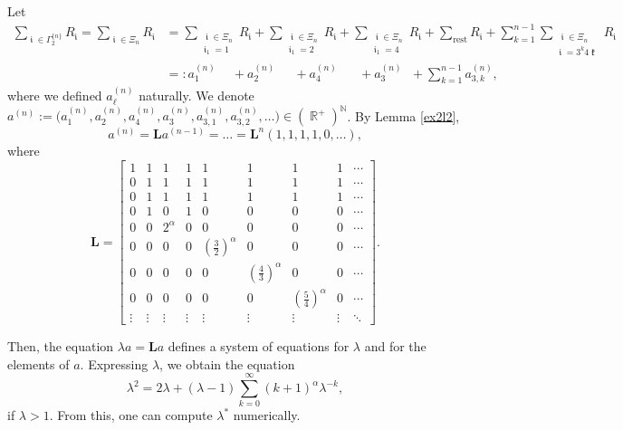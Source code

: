 \documentclass[a4paper, 11pt]{article}
\DeclareMathOperator{\N}{\mathbb{N}}
\DeclareMathOperator{\R}{\mathbb{R}}
\DeclareMathOperator{\iii}{\mathfrak{i}}
\DeclareMathOperator{\kkk}{\mathfrak{k}}
\numberwithin{equation}{section}
\theoremstyle{plain}
\theoremstyle{remark}
\theoremstyle{definition}
\begin{document}
Let
\begin{align*}
\sum_{\iii \in \Gamma_2^{\{n\}}} R_{\iii} = \sum_{\iii \in \Xi_n} R_{\iii} &= \sum_{\substack{\ \iii \in \Xi_n \\ \iii_1 = 1}} R_{\iii} + \sum_{\substack{\ \iii \in \Xi_n \\ \iii_1 = 2}} R_{\iii} + \sum_{\substack{\ \iii \in \Xi_n \\ \iii_1 = 4}} R_{\iii} + \sum_{\text{rest}} R_{\iii} + \sum_{k=1}^{n-1} \sum_{\substack{\ \iii \in \Xi_n \\ \iii = 3^k4\kkk}} R_{\iii} \\
&=: a_1^{(n)} \quad \  + a_2^{(n)} \quad \ \ + a_4^{(n)} \quad \ \ \ + a_3^{(n)} \ \ \, + \sum_{k=1}^{n-1} a_{3,k}^{(n)},
\end{align*}
where we defined $a_\ell^{(n)}$ naturally. We denote $a^{(n)} := \big( a_1^{(n)}, a_2^{(n)}, a_4^{(n)}, a_3^{(n)},  a_{3,1}^{(n)}, a_{3,2}^{(n)},\dots \big) \in (\R^+)^{\N}$. By Lemma \ref{ex2l2},
\begin{equation*}
a^{(n)} = \mathbf{L}a^{(n-1)}= \dots = \mathbf{L}^n(1,1,1,1,0,\dots),
\end{equation*}
where 
\begin{equation*}
\mathbf{L} = \begin{bmatrix}
1 & 1 & 1 & 1 & 1 & 1 & 1 & 1 &\cdots \\
0 & 1 & 1 & 1 & 1 & 1 & 1 & 1 &\cdots \\
0 & 1 & 1 & 1 & 1 & 1 & 1 & 1 &\cdots \\
0 & 1 & 0 & 1 & 0 & 0 & 0 & 0 &\cdots \\
0 & 0 & 2^\alpha & 0 & 0 & 0 & 0 & 0 &\cdots \\
0 & 0 & 0 & 0 & (\tfrac{3}{2})^\alpha & 0 & 0 & 0 &\cdots \\
0 & 0 & 0 & 0 & 0 & (\tfrac{4}{3})^\alpha & 0 & 0 &\cdots \\
0 & 0 & 0 & 0 & 0 & 0 & (\tfrac{5}{4})^\alpha & 0 &\cdots \\
\vdots & \vdots & \vdots & \vdots & \vdots & \vdots & \vdots & \vdots &\ddots
\end{bmatrix}.
\end{equation*}

Then, the equation $\lambda a = \mathbf{L} a$ defines a system of equations for $\lambda$ and for the elements of $a$. Expressing $\lambda$, we obtain the equation
\begin{equation*}
\lambda^2 = 2\lambda + (\lambda-1)\sum_{k=0}^\infty (k+1)^\alpha \lambda^{-k},
\end{equation*}
if $\lambda > 1$. From this, one can compute $\lambda^*$ numerically.












\end{document}

